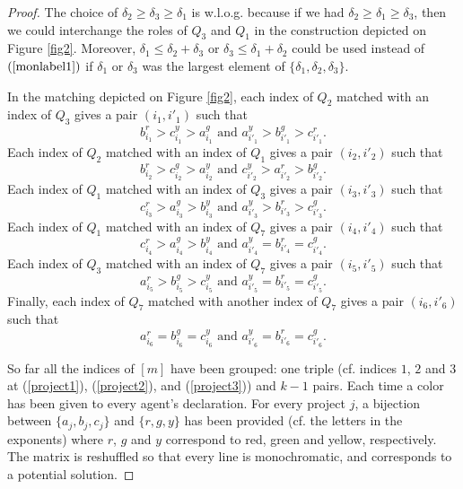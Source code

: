 \documentclass{article}
\begin{document}
\begin{proof}
The choice of $\delta_2 \ge \delta_3 \ge \delta_1$ is w.l.o.g. because if we had $\delta_2 \ge \delta_1 \ge \delta_3$, then we could interchange the roles of $Q_3$ and $Q_1$ in the construction depicted on  Figure \ref{fig2}.
 Moreover, $\delta_1 \le \delta_2+\delta_3$ or $\delta_3 \le \delta_1+\delta_2$ could be used instead of $(\ref{monlabel1})$ if $\delta_1$ or $\delta_3$ was the largest element of $\{\delta_1,\delta_2,\delta_3\}$.  


In the matching depicted on Figure \ref{fig2}, each index of $Q_2$   matched with an index of $Q_3$ gives a pair $(i_1,i'_1)$ such that
\begin{equation}b^r_{i_1} >c^y_{i_1}> a^g_{i_1}   \text{ and }
a^y_{i'_1} >b^g_{i'_1}> c^r_{i'_1}.
\end{equation}
Each index of $Q_2$ matched with an index of $Q_1$ gives a pair $(i_2,i'_2)$ such that
\begin{equation}b^r_{i_2} >c^g_{i_2}> a^y_{i_2}  \text{ and }
c^y_{i'_2} >a^r_{i'_2}> b^g_{i'_2}.
\end{equation}
Each  index of $Q_1$ matched with an index of $Q_3$ gives a pair $(i_3,i'_3)$ such that
\begin{equation}
c^r_{i_3} > a^g_{i_3}> b^y_{i_3} \text{ and }
a^y_{i'_3} >b^r_{i'_3}> c^g_{i'_3}.
\end{equation}
Each index of $Q_1$ matched with an index of $Q_7$ gives a pair $(i_4,i'_4)$ such that
\begin{equation}
c^r_{i_4} > a^g_{i_4}> b^y_{i_4} \text{ and }
a^y_{i'_4} =b^r_{i'_4}= c^g_{i'_4}.
\end{equation}
Each index of $Q_3$ matched with an index of $Q_7$ gives a pair $(i_5,i'_5)$ such that
\begin{equation}
a^r_{i_5} > b^g_{i_5}> c^y_{i_5} \text{ and }
a^y_{i'_5} =b^r_{i'_5}= c^g_{i'_5}.
\end{equation}
Finally, each index of $Q_7$ matched with another index of $Q_7$ gives a pair $(i_6,i'_6)$ such that
\begin{equation} \label{project77}
a^r_{i_6} = b^g_{i_6}= c^y_{i_6} \text{ and }
a^y_{i'_6} =b^r_{i'_6}= c^g_{i'_6}.
\end{equation}

So far all the indices of $[m]$ have been grouped: one triple (cf. indices $1$, $2$ and $3$ at (\ref{project1}), (\ref{project2}), and (\ref{project3})) and $k-1$ pairs. Each time a color has been given to every agent's declaration. For every project $j$, a bijection between  $\{a_j,b_j,c_j\}$ and $\{r,g,y\}$ has been provided (cf. the letters in the exponents) where $r$, $g$ and $y$ correspond to red, green and yellow, respectively. The matrix is reshuffled so that every line is monochromatic, and corresponds to a potential solution. 


\end{proof}
\end{document}
